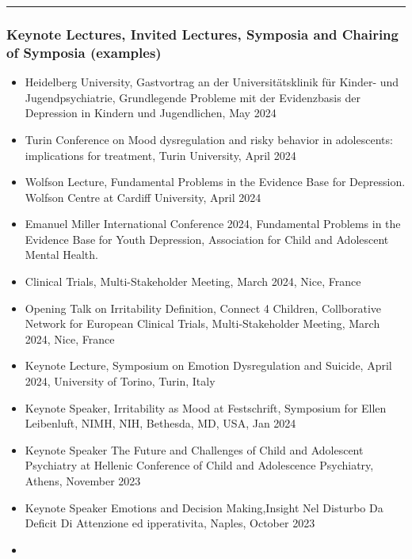 \documentclass[
]{article}
\providecommand{\tightlist}{%
  \setlength{\itemsep}{0pt}\setlength{\parskip}{0pt}}
\begin{document}
\begin{center}\rule{0.5\linewidth}{0.5pt}\end{center}

\hypertarget{keynote-lectures-invited-lectures-symposia-and-chairing-of-symposia-examples}{%
\subsubsection{Keynote Lectures, Invited Lectures, Symposia and Chairing
of Symposia
(examples)}\label{keynote-lectures-invited-lectures-symposia-and-chairing-of-symposia-examples}}

\begin{itemize}
\tightlist
\item
  Heidelberg University, Gastvortrag an der Universitätsklinik für
  Kinder- und Jugendpsychiatrie, Grundlegende Probleme mit der
  Evidenzbasis der Depression in Kindern und Jugendlichen, May 2024
\item
  Turin Conference on Mood dysregulation and risky behavior in
  adolescents: implications for treatment, Turin University, April 2024
\item
  Wolfson Lecture, Fundamental Problems in the Evidence Base for
  Depression. Wolfson Centre at Cardiff University, April 2024
\item
  Emanuel Miller International Conference 2024, Fundamental Problems in
  the Evidence Base for Youth Depression, Association for Child and
  Adolescent Mental Health.
\item
  Clinical Trials, Multi-Stakeholder Meeting, March 2024, Nice, France
\item
  Opening Talk on Irritability Definition, Connect 4 Children,
  Collborative Network for European Clinical Trials, Multi-Stakeholder
  Meeting, March 2024, Nice, France
\item
  Keynote Lecture, Symposium on Emotion Dysregulation and Suicide, April
  2024, University of Torino, Turin, Italy
\item
  Keynote Speaker, Irritability as Mood at Festschrift, Symposium for
  Ellen Leibenluft, NIMH, NIH, Bethesda, MD, USA, Jan 2024
\item
  Keynote Speaker The Future and Challenges of Child and Adolescent
  Psychiatry at Hellenic Conference of Child and Adolescence Psychiatry,
  Athens, November 2023
\item
  Keynote Speaker Emotions and Decision Making,Insight Nel Disturbo Da
  Deficit Di Attenzione ed ipperativita, Naples, October 2023
\item

\end{itemize}
\end{document}
